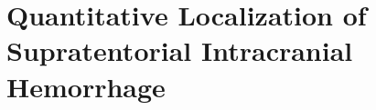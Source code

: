 
































%

\newif\ifseverity
\severitytrue
\chapter{Quantitative Localization of Supratentorial Intracranial Hemorrhage}
\label{chap:stroke}



